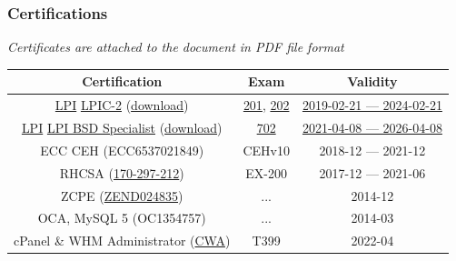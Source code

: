 \documentclass {article}
\begin{document}
    \subsubsection {Certifications}
    \begin{center}
        \textit {Certificates are attached to the document in PDF file format} \\
        \begin {tabular} { | c | c | c | }
            \hline
            \textbf {Certification} & \textbf {Exam} & \textbf {Validity} \\
            \hline

            \href{https://en.wikipedia.org/wiki/Linux_Professional_Institute}{LPI} \href{https://www.lpi.org/our-certifications/lpic-2-overview}{LPIC-2} (\href{https://cs.lpi.org/caf/Xamman/candidate_area/certificate/LPIC-2/bafrejwgeb}{download}) & \href{https://www.lpi.org/our-certifications/exam-201-objectives}{201}, \href{https://www.lpi.org/our-certifications/exam-202-objectives}{202} & \href{https://cs.lpi.org/caf/Xamman/certification/verify/LPI000307519/bafrejwgeb}{2019-02-21 --- 2024-02-21} \\

            \href{https://en.wikipedia.org/wiki/Linux_Professional_Institute}{LPI} \href{https://www.lpi.org/our-certifications/bsd-overview}{LPI BSD Specialist} (\href{https://cs.lpi.org/caf/Xamman/candidate_area/certificate/BSDS/mvuk2szhhw}{download}) & \href{https://www.lpi.org/our-certifications/exam-702-objectives}{702} & \href{https://cs.lpi.org/caf/Xamman/certification/verify/LPI000307519/mvuk2szhhw}{2021-04-08 --- 2026-04-08} \\

            ECC CEH (ECC6537021849) & CEHv10 & 2018-12 --- 2021-12 \\

            RHCSA (\href{https://rhtapps.redhat.com/verify?certId=170-297-212}{170-297-212}) & EX-200 & 2017-12 --- 2021-06 \\

            ZCPE (\href{https://www.zend-zce.com/en/yellow-pages/ZEND024835}{ZEND024835}) & ... & 2014-12 \\

            OCA, MySQL 5 (OC1354757) & ... & 2014-03 \\

            cPanel \& WHM Administrator (\href{https://university.cpanel.net/certificate/9ab9-47b2-9900-14d2}{CWA}) & T399 & 2022-04 \\

            \hline
        \end{tabular}
    \end{center}
\end{document}
